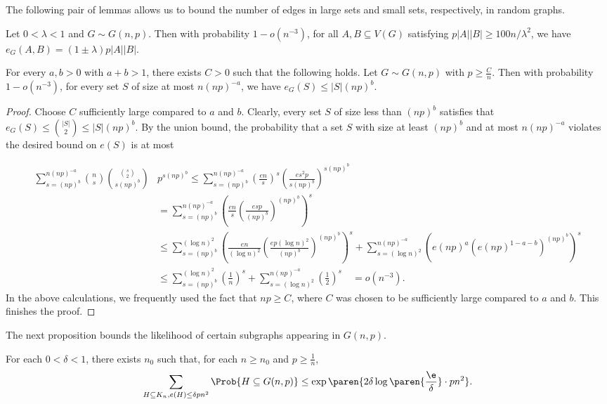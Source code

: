 \documentclass[10pt,a4paper,reqno]{amsart}
\begin{document}
The following pair of lemmas allows us to bound the number of edges in large sets and small sets, respectively, in random graphs.
\begin{lemma}\label{lem:large-sets-pseudorandom-property-Gnp}
Let $0 < \lambda < 1$ and $G \sim G(n,p)$. Then with probability $1-o(n^{-3})$, for all $A,B\subseteq V(G)$ satisfying $p|A||B|\ge 100n/\lambda^2$, we have $e_G(A,B) = (1\pm \lambda)p|A||B|$.
\end{lemma}

\begin{lemma}\label{lem:small-sets-cannot-contain-too-many-edges}
For every $a,b >0$ with $a+b > 1$, there exists $C >0$ such that the following holds. Let $G \sim G(n,p)$ with $p\ge \frac{C}{n}$. Then with probability $1-o(n^{-3})$, for every set $S$ of size at most $n(np)^{-a}$, we have $e_G(S)\le |S|(np)^{b}$.
\end{lemma}
\begin{proof}
Choose $C$ sufficiently large compared to $a$ and $b$. Clearly, every set $S$ of size less than $(np)^{b}$ satisfies that $e_G(S)\le \binom{|S|}{2}\le |S|(np)^{b}$. By the union bound, the probability that a set $S$ with size at least  $(np)^{b}$ and at most $n(np)^{-a}$ violates the desired bound on $e(S)$ is at most 

\begin{align*}
\sum_{s=(np)^{b}}^{n(np)^{-a}} \binom{n}{s} \binom{\binom{s}{2}}{s(np)^{b}} &p^{s(np)^{b}} 
\le \sum_{s=(np)^{b}}^{n(np)^{-a}} \left(\frac{en}{s}\right)^s \left(\frac{es^2 p}{s(np)^{b}}\right)^{s(np)^{b}} \\
&= \sum_{s=(np)^{b}}^{n(np)^{-a}} \left(\frac{en}{s}\left(\frac{esp}{(np)^{b}}\right)^{(np)^{b}}\right)^s
\\
&\le \sum_{s=(np)^b}^{(\log{n})^2} \left(\frac{en}{(\log{n})^2}\left(\frac{ep(\log{n})^2}{(np)^{b}}\right)^{(np)^{b}}\right)^s + \sum_{s=(\log{n})^2}^{n(np)^{-a}} \left(e(np)^a\left(e(np)^{1-a-b}\right)^{(np)^{b}}\right)^s 
\\
&\le \sum_{s=(np)^{b}}^{(\log{n})^2} \left(\frac{1}{n}\right)^s + \sum_{s=(\log{n})^2}^{n(np)^{-a}} \left(\frac{1}{2}\right)^s
\quad = o(n^{-3}).
\end{align*}
In the above calculations, we frequently used the fact that $np\ge C$, where $C$ was chosen to be sufficiently large compared to $a$ and $b$. This finishes the proof.
\end{proof}


The next proposition bounds the likelihood of certain subgraphs appearing in $G(n,p)$.
\begin{proposition}
  \label{prop:sparse-containment-Gnp}
  For each $0 < \delta < 1$, there exists $n_0$ such that, for each $n \geq n_0$ and $p \geq
  \frac{1}{n}$,
  \begin{equation*}
    \sum_{H \subseteq K_n, e(H) \leq \delta p n^2} \Prob{H \subseteq G(n, p)} \leq \exp{\paren{2\delta \log\paren{\frac{\e}{\delta}} \cdot pn^2}}.
  \end{equation*}
\end{proposition}
\end{document}
